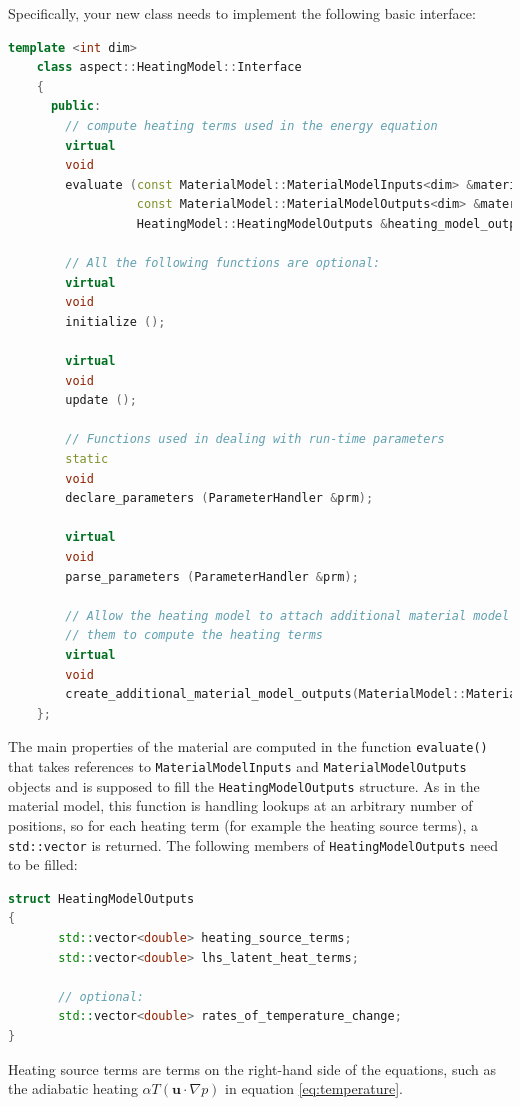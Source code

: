 \documentclass{article}
\begin{document}
Specifically, your new class needs to implement the following basic interface:
\begin{lstlisting}[frame=single,language=C++]
    template <int dim>
    class aspect::HeatingModel::Interface
    {
      public:
        // compute heating terms used in the energy equation
        virtual
        void
        evaluate (const MaterialModel::MaterialModelInputs<dim> &material_model_inputs,
                  const MaterialModel::MaterialModelOutputs<dim> &material_model_outputs,
                  HeatingModel::HeatingModelOutputs &heating_model_outputs) const;

        // All the following functions are optional:
        virtual
        void
        initialize ();
        
        virtual
        void
        update ();

        // Functions used in dealing with run-time parameters
        static
        void
        declare_parameters (ParameterHandler &prm);

        virtual
        void
        parse_parameters (ParameterHandler &prm);
        
        // Allow the heating model to attach additional material model outputs in case it needs
        // them to compute the heating terms
        virtual
        void
        create_additional_material_model_outputs(MaterialModel::MaterialModelOutputs<dim> &) const;
    };
\end{lstlisting}
The main properties of the material are computed in the function
\texttt{evaluate()} that takes references to
\texttt{MaterialModelInputs} and \texttt{MaterialModelOutputs} objects
and is supposed to fill the
\texttt{HeatingModelOutputs} structure. As in the material model, this function is handling lookups at an 
arbitrary number of positions, so for each heating term (for example the heating source terms), a \texttt{std::vector} 
is returned. The following members of \texttt{HeatingModelOutputs} need to be filled:
\begin{lstlisting}[frame=single,language=C++]
struct HeatingModelOutputs
{
       std::vector<double> heating_source_terms;
       std::vector<double> lhs_latent_heat_terms;
       
       // optional:
       std::vector<double> rates_of_temperature_change;
}
\end{lstlisting}
Heating source terms are terms on the right-hand side of the equations, such as the adiabatic heating
$\alpha T \left( \mathbf u \cdot \nabla p \right)$ in equation \eqref{eq:temperature}. 
\end{document}
